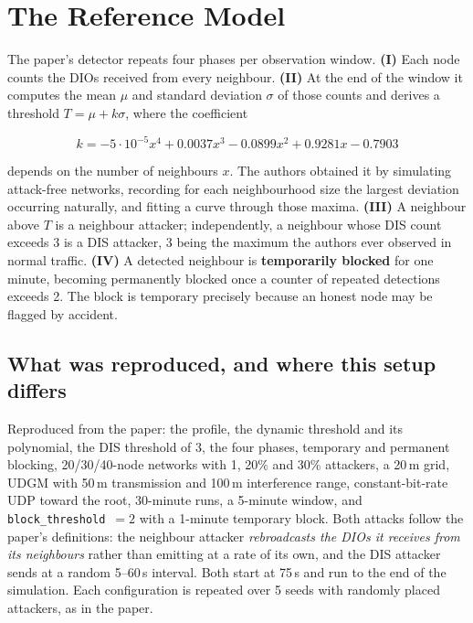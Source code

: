 \documentclass[11pt, a4paper]{article}
\begin{document}
\section{The Reference Model}

The paper's detector repeats four phases per observation window. \textbf{(I)} Each node counts the DIOs received from every neighbour. \textbf{(II)} At the end of the window it computes the mean $\mu$ and standard deviation $\sigma$ of those counts and derives a threshold $T=\mu+k\sigma$, where the coefficient

\begin{equation}
  k = -5\cdot10^{-5}x^{4} + 0.0037x^{3} - 0.0899x^{2} + 0.9281x - 0.7903
  \label{eq:k}
\end{equation}

depends on the number of neighbours $x$. The authors obtained it by simulating attack-free networks, recording for each neighbourhood size the largest deviation occurring naturally, and fitting a curve through those maxima. \textbf{(III)} A neighbour above $T$ is a neighbour attacker; independently, a neighbour whose DIS count exceeds 3 is a DIS attacker, 3 being the maximum the authors ever observed in normal traffic. \textbf{(IV)} A detected neighbour is \textbf{temporarily blocked} for one minute, becoming permanently blocked once a counter of repeated detections exceeds 2. The block is temporary precisely because an honest node may be flagged by accident.

\subsection{What was reproduced, and where this setup differs}
\label{sec:params}

Reproduced from the paper: the profile, the dynamic threshold and its polynomial, the DIS threshold of 3, the four phases, temporary and permanent blocking, 20/30/40-node networks with 1, 20\% and 30\% attackers, a 20\,m grid, UDGM with 50\,m transmission and 100\,m interference range, constant-bit-rate UDP toward the root, 30-minute runs, a 5-minute window, and \texttt{block\_threshold}~$=2$ with a 1-minute temporary block. Both attacks follow the paper's definitions: the neighbour attacker \textit{rebroadcasts the DIOs it receives from its neighbours} rather than emitting at a rate of its own, and the DIS attacker sends at a random 5--60\,s interval. Both start at 75\,s and run to the end of the simulation. Each configuration is repeated over 5 seeds with randomly placed attackers, as in the paper.
\end{document}
